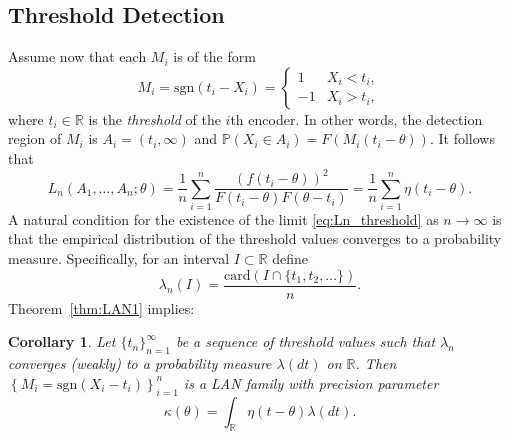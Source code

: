 \documentclass[letterpaper, 11pt]{IEEEtran}      %
\newtheorem{cor}[thm]{\bf {Corollary}}
\newcommand{\card}{\mathrm{card}}
\newcommand{\sgn}{\mathrm{sgn} }
\begin{document}
\subsection{Threshold Detection}
Assume now that each $M_i$ is of the form
\begin{equation}
\label{eq:threshold_message}
M_i = \sgn(t_i - X_i) = \begin{cases} 1 & X_i< t_i, \\
-1 & X_i > t_i,
\end{cases}  
\end{equation}
where $t_i\in\mathbb R$ is the \emph{threshold} of the $i$th encoder. In other words, the detection region of $M_i$ is $A_i = (t_i,\infty)$ and $\mathbb P(X_i \in A_i) = F \left( M_i(t_i-\theta) \right)$. It follows that
\begin{equation}
L_n(A_1,\ldots,A_n;\theta) = \frac{1}{n} \sum_{i=1}^n \frac{ \left(f(t_i-\theta) \right)^2 }{F\left(t_i-\theta \right) F\left(\theta - t_i \right) }  = \frac{1}{n} \sum_{i=1}^n \eta(t_i - \theta).
\label{eq:Ln_threshold}
\end{equation}
A natural condition for the existence of the limit \eqref{eq:Ln_threshold} as $n\to \infty$ is that the empirical distribution of the threshold values converges to a probability measure. Specifically, for an interval $I \subset \mathbb R$ define
\[
\lambda_n(I) = \frac{ \card \left( I \cap \{t_1,t_2,\ldots \} \right)}{n}. 
\]
Theorem~\ref{thm:LAN1} implies:
\begin{cor} \label{cor:LAN_thresh}
Let $\{t_n\}_{n=1}^\infty$ be a sequence of threshold values such that $\lambda_n$ converges (weakly) to a probability measure $\lambda(dt)$ on $\mathbb R$. Then $\left\{ M_i = \sgn(X_i - t_i) \right\}_{i=1}^n$ is a LAN family with precision parameter
\[
\kappa(\theta) = \int_{\mathbb R} \eta(t-\theta) \lambda(dt). 
\]
\end{cor}
\end{document}
